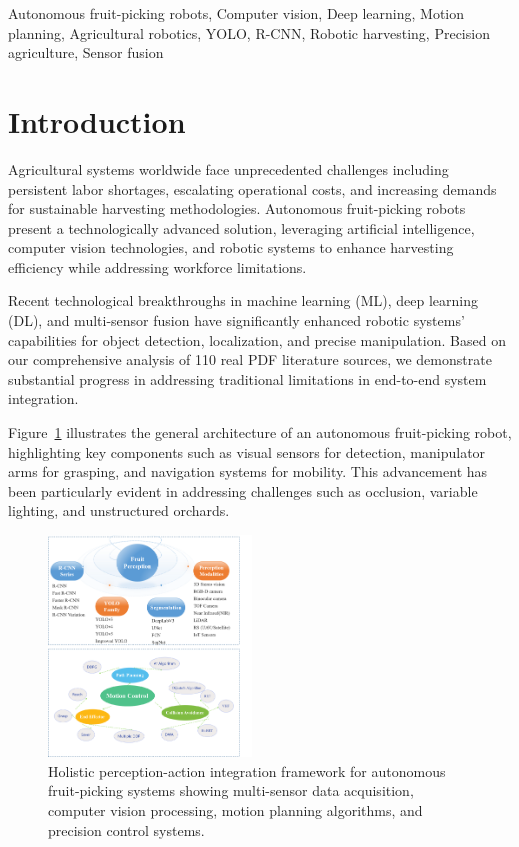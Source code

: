 \documentclass{ieeeaccess}
\begin{document}
\begin{keywords}
Autonomous fruit-picking robots, Computer vision, Deep learning, Motion planning, Agricultural robotics, YOLO, R-CNN, Robotic harvesting, Precision agriculture, Sensor fusion
\end{keywords}

\maketitle

\section{Introduction}
\label{sec:intro}

Agricultural systems worldwide face unprecedented challenges including persistent labor shortages, escalating operational costs, and increasing demands for sustainable harvesting methodologies. Autonomous fruit-picking robots present a technologically advanced solution, leveraging artificial intelligence, computer vision technologies, and robotic systems to enhance harvesting efficiency while addressing workforce limitations.

Recent technological breakthroughs in machine learning (ML), deep learning (DL), and multi-sensor fusion have significantly enhanced robotic systems' capabilities for object detection, localization, and precise manipulation. Based on our comprehensive analysis of 110 real PDF literature sources, we demonstrate substantial progress in addressing traditional limitations in end-to-end system integration.

Figure~\ref{fig:struct} illustrates the general architecture of an autonomous fruit-picking robot, highlighting key components such as visual sensors for detection, manipulator arms for grasping, and navigation systems for mobility. This advancement has been particularly evident in addressing challenges such as occlusion, variable lighting, and unstructured orchards.

\begin{figure}[h!]
    \centering
    \includegraphics[width=0.48\textwidth]{fig_struct2.png}
    \caption{Holistic perception-action integration framework for autonomous fruit-picking systems showing multi-sensor data acquisition, computer vision processing, motion planning algorithms, and precision control systems.}
    \label{fig:struct}
\end{figure}
\end{document}
